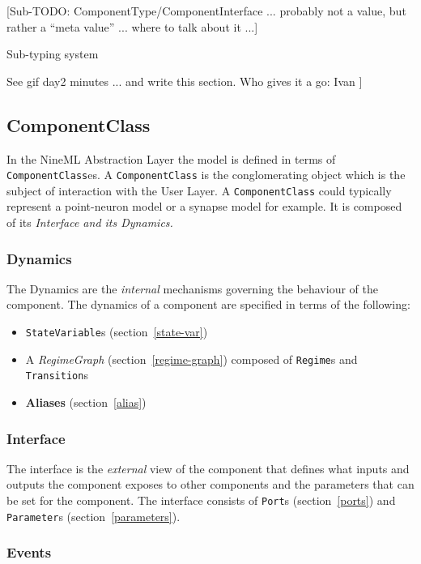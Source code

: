 \documentclass{article}
\begin{document}
[Sub-TODO: ComponentType/ComponentInterface ... probably not a
value, but rather a ``meta value'' ... where to talk about it ...]


Sub-typing system

See gif day2 minutes ... and write this section.
Who gives it a go: Ivan
]

\subsection{ComponentClass}

In the NineML Abstraction Layer the model is defined in terms of
{\tt ComponentClass}es. A {\tt ComponentClass} is the conglomerating
object which is the subject of interaction with the User Layer.
A {\tt ComponentClass} could typically represent
a point-neuron model or a synapse model for example. It is composed of
its \em{Interface} and its \em{Dynamics}.

\subsubsection{Dynamics}

The Dynamics are the \emph{internal} mechanisms governing the behaviour
of the component. The dynamics of a component are specified in terms of
the following:

\begin{itemize}
\item {\tt StateVariable}s (section~\ref{state-var})
\item A \emph{RegimeGraph} (section~\ref{regime-graph}) composed of {\tt Regime}s
and {\tt Transition}s
\item \textbf{Aliases} (section~\ref{alias})
\end{itemize}

\subsubsection{Interface}

The interface is the \emph{external} view of the component that defines
what inputs and outputs the component exposes to other components and the
parameters that can be set for the component. The interface consists of
{\tt Port}s (section~\ref{ports}) and {\tt Parameter}s
(section~\ref{parameters}).

\subsubsection{Events}
\label{events}
\end{document}
